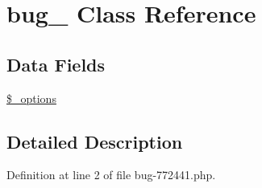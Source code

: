 \hypertarget{classbug__772441}{\section{bug\-\_ \-Class \-Reference}
\label{classbug__772441}
}
\subsection*{\-Data \-Fields}
\begin{DoxyCompactItemize}
\item 
\hyperlink{classbug__772441_a1bebdc689c84eee59ad24c77e5531762}{\$\-\_\-options}
\end{DoxyCompactItemize}


\subsection{\-Detailed \-Description}


\-Definition at line 2 of file bug-\/772441.\-php.



